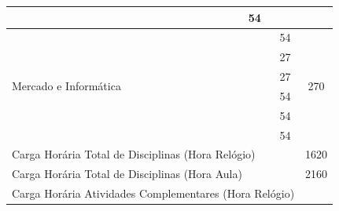 \documentclass[11pt,fleqn]{book} %
\begin{document}
\begin{table}[]
{\begin{tabular}{|l|l|c|c|c|c|c|c|c|}
			& \nameref{5_lab}                                               &                 &                 &                 &                 & 54              &                 &                      \\ \hline
			\multirow{6}{*}{Mercado e Informática}                           
			& \nameref{6_ia}                                             &                 &                 &                 &                 &                 & 54              & \multirow{6}{*}{270} \\ \cline{2-8}
			& \nameref{6_seginfo}                                        &                 &                 &                 &                 &                 & 27              &                      \\ \cline{2-8}
			& \nameref{6_empdig}                                         &                 &                 &                 &                 &                 & 27              &                      \\ \cline{2-8}
			& \nameref{6_datascience}                                    &                 &                 &                 &                 &                 & 54              &                      \\ \cline{2-8}
			& \nameref{6_visstory}                                       &                 &                 &                 &                 &                 & 54              &                      \\ \cline{2-8}
			& \nameref{6_govproj}                                        &                 &                 &                 &                 &                 & 54              &                      \\ \hline
			\multicolumn{8}{|l|}{Carga Horária Total de Disciplinas (Hora Relógio)}                                                                                                                                                                                     
			& 1620                 \\ \hline
			\multicolumn{8}{|l|}{Carga Horária Total de Disciplinas (Hora Aula)}                                                                                                                                                                                        
			& 2160                 \\ \hline
			\multicolumn{8}{|l|}{Carga Horária Atividades Complementares (Hora Relógio)}                                                                                                                                                                                     

\end{tabular}}
\end{table}
\end{document}
